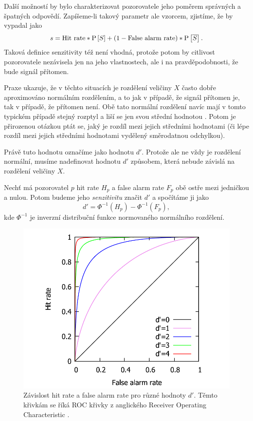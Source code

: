 Další možností by bylo charakterizovat pozorovatele jeho poměrem správných
a špatných odpovědí. Zapíšeme-li takový parametr ale vzorcem, zjistíme, že by vypadal jako
$$s=\text{Hit rate}*\P{S} + (1-\text{False alarm rate})*\P{\overline{S}}.$$ 
Taková definice senzitivity též není vhodná, protože potom by citlivost pozorovatele
nezávisela jen na jeho vlastnostech, ale i na pravděpodobnosti, že bude signál přítomen.

Praxe ukazuje, že v těchto situacích je rozdělení veličiny $X$ často dobře
aproximováno normálním rozdělením, a to jak v případě, že signál přítomen je,
tak v případě, že přítomen není. Obě tato normální rozdělení navíc mají v tomto
typickém případě stejný rozptyl a liší se jen svou střední hodnotou \citep{SwetsSDT}. Potom je
přirozenou otázkou ptát se, jaký je rozdíl mezi jejich středními hodnotami (či lépe
rozdíl mezi jejich středními hodnotami vydělený směrodatnou odchylkou).

Právě tuto hodnotu označíme jako hodnotu $d'$. Protože ale ne vždy je rozdělení
normální, musíme nadefinovat hodnotu $d'$ způsobem, která nebude závislá na rozdělení
veličiny $X$.

\begin{definice}\label{dprime}
Nechť má pozorovatel $p$ hit rate $H_p$ a false alarm rate $F_p$ obě ostře mezi jedničkou a nulou. Potom budeme jeho \emph{senzitivitu}
značit $d'$ a spočítáme ji jako $$d' = \Phi^{-1}(H_p) - \Phi^{-1}(F_p),$$ kde $\Phi^{-1}$ je inverzní distribuční funkce normovaného normálního rozdělení.
\end{definice}



\begin{figure}[h!]
  \includegraphics[width=.8\linewidth]{graphs/ROC.pdf}
  \centering
\caption{Závislost hit rate a false alarm rate pro různé hodnoty $d'$. Těmto křivkám se říká ROC křivky z anglického Receiver Operating Characteristic \citep{SwetsSDT,GreenSDT}.} 
\label{obr:dprime} 
\end{figure}



